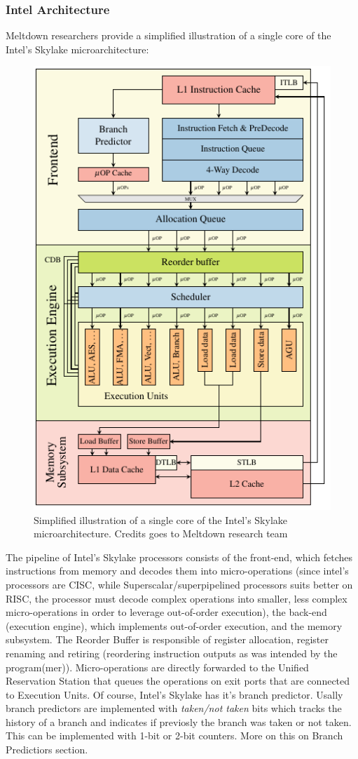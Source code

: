 \subsubsection{Intel Architecture}
Meltdown researchers provide a simplified illustration of a single core of the Intel's Skylake microarchitecture:

\begin{figure}
    \includegraphics[scale=0.5]{img/skylake.png}
    \caption{Simplified illustration of a single core of the Intel's Skylake microarchitecture. Credits goes to Meltdown research team}
\end{figure}

The pipeline of Intel's Skylake processors consists of the front-end, which fetches instructions from memory and decodes them into micro-operations
(since intel's processors are CISC, while Superscalar/superpipelined processors suits better on RISC, the processor must decode complex operations
into smaller, less complex micro-operations in order to leverage out-of-order execution), the back-end (execution engine), which implements
out-of-order execution, and the memory subsystem.
The Reorder Buffer is responsible of register allocation, register renaming and retiring (reordering instruction outputs
as was intended by the program(mer)).
Micro-operations are directly forwarded to the Unified Reservation Station that queues the operations on exit ports that are connected to Execution Units.
Of course, Intel's Skylake has it's branch predictor. Usally branch predictors are implemented with \textit{taken/not taken} bits which tracks the history
of a branch and indicates if previosly the branch was taken or not taken. This can be implemented with 1-bit or 2-bit counters. More on this on Branch Predictiors section.

